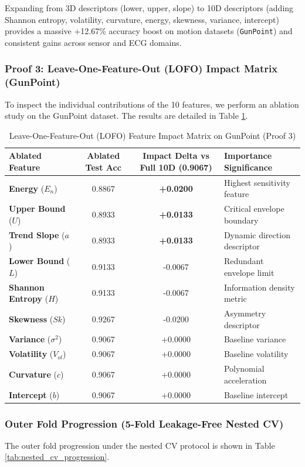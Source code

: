\documentclass[conference]{IEEEtran}
\begin{document}
Expanding from 3D descriptors (lower, upper, slope) to 10D descriptors (adding Shannon entropy, volatility, curvature, energy, skewness, variance, intercept) provides a massive +12.67\% accuracy boost on motion datasets (\texttt{GunPoint}) and consistent gains across sensor and ECG domains.

\subsubsection{Proof 3: Leave-One-Feature-Out (LOFO) Impact Matrix (GunPoint)}
To inspect the individual contributions of the 10 features, we perform an ablation study on the GunPoint dataset. The results are detailed in Table \ref{tab:lofo_matrix}.

\begin{table}[htbp]
\caption{Leave-One-Feature-Out (LOFO) Feature Impact Matrix on GunPoint (Proof 3)}
\label{tab:lofo_matrix}
\centering
\begin{tabular}{|l|c|c|l|}
\hline
Ablated Feature & Ablated Test Acc & Impact Delta vs Full 10D (0.9067) & Importance Significance \\ \hline
\textbf{Energy} ($E_{n}$) & 0.8867 & \textbf{+0.0200} & Highest sensitivity feature \\ \hline
\textbf{Upper Bound} ($U$) & 0.8933 & \textbf{+0.0133} & Critical envelope boundary \\ \hline
\textbf{Trend Slope} ($a$) & 0.8933 & \textbf{+0.0133} & Dynamic direction descriptor \\ \hline
\textbf{Lower Bound} ($L$) & 0.9133 & -0.0067 & Redundant envelope limit \\ \hline
\textbf{Shannon Entropy} ($H$) & 0.9133 & -0.0067 & Information density metric \\ \hline
\textbf{Skewness} ($Sk$) & 0.9267 & -0.0200 & Asymmetry descriptor \\ \hline
\textbf{Variance} ($\sigma^2$) & 0.9067 & +0.0000 & Baseline variance \\ \hline
\textbf{Volatility} ($V_{ol}$) & 0.9067 & +0.0000 & Baseline volatility \\ \hline
\textbf{Curvature} ($c$) & 0.9067 & +0.0000 & Polynomial acceleration \\ \hline
\textbf{Intercept} ($b$) & 0.9067 & +0.0000 & Baseline intercept \\ \hline
\end{tabular}
\end{table}

\subsubsection{Outer Fold Progression (5-Fold Leakage-Free Nested CV)}
The outer fold progression under the nested CV protocol is shown in Table \ref{tab:nested_cv_progression}.
\end{document}
